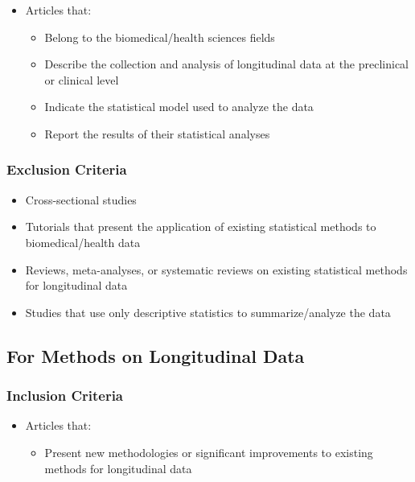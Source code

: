 \documentclass[
]{article}
\providecommand{\tightlist}{%
  \setlength{\itemsep}{0pt}\setlength{\parskip}{0pt}}\usepackage{longtable,booktabs,array}
\begin{document}
\begin{itemize}
\item
  Articles that:

  \begin{itemize}
  \item
    Belong to the biomedical/health sciences fields
  \item
    Describe the collection and analysis of longitudinal data at the
    preclinical or clinical level
  \item
    Indicate the statistical model used to analyze the data
  \item
    Report the results of their statistical analyses
  \end{itemize}
\end{itemize}

\hypertarget{exclusion-criteria}{%
\subsubsection{Exclusion Criteria}\label{exclusion-criteria}}

\begin{itemize}
\item
  Cross-sectional studies
\item
  Tutorials that present the application of existing statistical methods
  to biomedical/health data
\item
  Reviews, meta-analyses, or systematic reviews on existing statistical
  methods for longitudinal data
\item
  Studies that use only descriptive statistics to summarize/analyze the
  data
\end{itemize}

\hypertarget{for-methods-on-longitudinal-data-1}{%
\subsection{For Methods on Longitudinal
Data}\label{for-methods-on-longitudinal-data-1}}

\hypertarget{inclusion-criteria-1}{%
\subsubsection{Inclusion Criteria}\label{inclusion-criteria-1}}

\begin{itemize}
\item
  Articles that:

  \begin{itemize}
  \tightlist
  \item
    Present new methodologies or significant improvements to existing
    methods for longitudinal data
  \end{itemize}
\end{itemize}
\end{document}
